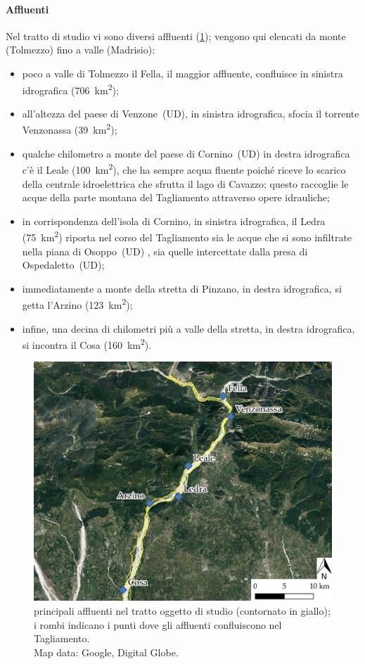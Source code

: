 \paragraph{Affluenti}
Nel tratto di studio vi sono diversi affluenti (\cref{fig:affluenti}); vengono qui elencati da monte (Tolmezzo) fino a valle (Madrisio):
%
\begin{itemize}
	\item poco a valle di Tolmezzo il Fella, il maggior affluente, confluisce in sinistra idrografica (\SI{706}{\kilo\m\tothe{2}});
	\item all'altezza del paese di Venzone~(UD), in sinistra idrografica, sfocia il torrente Venzonassa (\SI{39}{\kilo\m\tothe{2}});
	\item qualche chilometro a monte del paese di Cornino~(UD) in destra idrografica c'è il Leale (\SI{100}{\kilo\m\tothe{2}}), che ha sempre acqua fluente poiché riceve lo scarico della centrale idroelettrica che sfrutta il lago di Cavazzo; questo raccoglie le acque della parte montana del Tagliamento attraverso opere idrauliche;
	\item in corrispondenza dell'isola di Cornino, in sinistra idrografica, il Ledra (\SI{75}{\kilo\m\tothe{2}}) riporta nel corso del Tagliamento sia le acque che si sono infiltrate nella piana di Osoppo~(UD) , sia quelle intercettate dalla presa di Ospedaletto~(UD);
	\item immediatamente a monte della stretta di Pinzano, in destra idrografica, si getta l'Arzino (\SI{123}{\kilo\m\tothe{2}});
	\item infine, una decina di chilometri più a valle della stretta, in destra idrografica, si incontra il Cosa (\SI{160}{\kilo\m\tothe{2}}).
\end{itemize}
%
\begin{figure}
	\centering
	\includegraphics[width=\textwidth]{files/overview_affluenti.jpeg}
	\caption[principali affluenti nel tratto oggetto di studio]{principali affluenti nel tratto oggetto di studio (contornato in giallo); i rombi indicano i punti dove gli affluenti confluiscono nel Tagliamento.
	\\
	Map data: Google, Digital Globe.}
	\label{fig:affluenti}
\end{figure}
